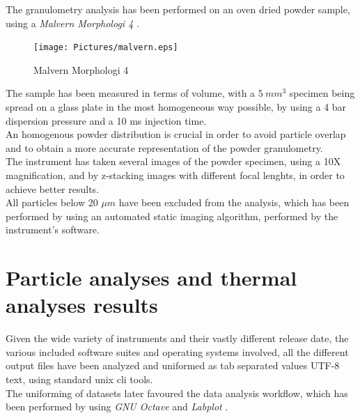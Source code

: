 \documentclass{article}
\begin{document}
        The granulometry analysis has been performed on an oven dried powder sample, 
        using a \textit{Malvern Morphologi 4} \autocites{Malvern_Morphologi4}. \\ 

        \begin{figure}[h!]
            \centering
            \texttt{[image: Pictures/malvern.eps]}
            \caption{Malvern Morphologi 4 \autocites{Malvern_Morphologi4}}
            \label{fig:morphologi4}
        \end{figure}

        The sample has been measured in terms of volume, with a $5 \ mm^3$ specimen being spread on a glass plate in the 
        most homogeneous way possible, by using a 4 bar dispersion pressure and a 10 ms injection time. \\ 

        An homogenous powder distribution is crucial in order to avoid particle overlap and to obtain a more accurate 
        representation of the powder granulometry. \\ 

        The instrument has taken several images of the powder specimen, using a 10X magnification, and by z-stacking 
        images with different focal lenghts, in order to achieve better results. \\

        All particles below 20 $\mu m$ have been excluded from the analysis, which has been performed by using an automated 
        static imaging algorithm, performed by the instrument's software. \\ 

      \clearpage

      \section{Particle analyses and thermal analyses results\label{analyses_results_general}}

      Given the wide variety of instruments and their vastly different release date, the various included software suites and operating systems involved,
      all the different output files have been analyzed and uniformed as tab separated values UTF-8 text, using standard unix cli tools. \\ 
      
      The uniforming of datasets later favoured the data analysis workflow, which has been performed by using \textit{GNU Octave} \autocites{Octave} and \textit{Labplot} \autocites{Labplot}. \\
\end{document}
